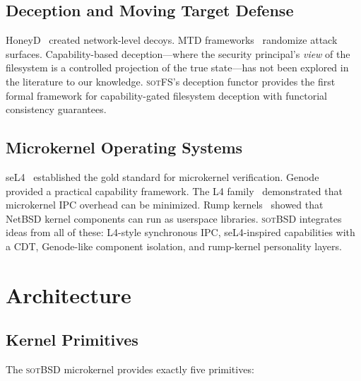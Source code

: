 \documentclass[11pt,a4paper]{article}
\theoremstyle{definition}
\theoremstyle{remark}
\newcommand{\sotfs}{\textsc{sotFS}}
\newcommand{\sotbsd}{\textsc{sotBSD}}
\begin{document}
\subsection{Deception and Moving Target Defense}

HoneyD~\cite{provos2004} created network-level decoys.
MTD frameworks~\cite{jajodia2011} randomize attack surfaces.
Capability-based deception---where the security principal's
\emph{view} of the filesystem is a controlled projection of the true
state---has not been explored in the literature to our knowledge.
\sotfs{}'s deception functor provides the first formal framework
for capability-gated filesystem deception with functorial consistency
guarantees.

\subsection{Microkernel Operating Systems}

seL4~\cite{klein2009} established the gold standard for microkernel
verification. Genode~\cite{feske2015} provided a practical capability
framework. The L4 family~\cite{liedtke1993} demonstrated that
microkernel IPC overhead can be minimized. Rump kernels~\cite{kantee2012}
showed that NetBSD kernel components can run as userspace libraries.
\sotbsd{} integrates ideas from all of these: L4-style synchronous
IPC, seL4-inspired capabilities with a CDT, Genode-like component
isolation, and rump-kernel personality layers.

\section{Architecture}
\label{sec:arch}

\subsection{Kernel Primitives}
\label{sec:arch-primitives}

The \sotbsd{} microkernel provides exactly five primitives:
\end{document}
